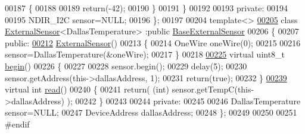 \begin{DoxyCode}
00187         \{
00188 
00189             \textcolor{keywordflow}{return}(-42);
00190         \}
00191     \}
00192 
00193 \textcolor{keyword}{private}:
00194 
00195     NDIR\_I2C sensor=NULL;
00196 \};
00197 
00204 \textcolor{keyword}{template}<>
\hyperlink{class_external_sensor_3_01_dallas_temperature_01_4}{00205} \textcolor{keyword}{class }\hyperlink{class_external_sensor}{ExternalSensor}<DallasTemperature> :\textcolor{keyword}{public} \hyperlink{class_base_external_sensor}{BaseExternalSensor}
00206 \{
00207 \textcolor{keyword}{public}:
\hyperlink{class_external_sensor_3_01_dallas_temperature_01_4_ad290681e8780cdf1870416eee99d699d}{00212}     \hyperlink{class_external_sensor_3_01_dallas_temperature_01_4_ad290681e8780cdf1870416eee99d699d}{ExternalSensor}()
00213     \{
00214         OneWire oneWire(0);
00215         
00216         sensor=DallasTemperature(&oneWire);
00217     \}
00218     
\hyperlink{class_external_sensor_3_01_dallas_temperature_01_4_ac5275129b05e2ff8df45d5b222a661d9}{00225}     \textcolor{keyword}{virtual} uint8\_t \hyperlink{class_external_sensor_3_01_dallas_temperature_01_4_ac5275129b05e2ff8df45d5b222a661d9}{begin}()
00226     \{
00227         
00228         sensor.begin(); 
00229         delay(5);
00230         sensor.getAddress(this->dallasAddress, 1);  
00231         \textcolor{keywordflow}{return}(\textcolor{keyword}{true});
00232     \}
\hyperlink{class_external_sensor_3_01_dallas_temperature_01_4_a127ead06440ec972c22db2abeb8e2b51}{00239}     \textcolor{keyword}{virtual} \textcolor{keywordtype}{int} \hyperlink{class_external_sensor_3_01_dallas_temperature_01_4_a127ead06440ec972c22db2abeb8e2b51}{read}()
00240     \{
00241          \textcolor{keywordflow}{return}( (\textcolor{keywordtype}{int}) sensor.getTempC(this->dallasAddress) );
00242     \}
00243 
00244 \textcolor{keyword}{private}:
00245 
00246     DallasTemperature sensor=NULL;
00247     DeviceAddress dallasAddress;
00248 \};
00249 
00250 
00251 \textcolor{preprocessor}{#endif}
\end{DoxyCode}
